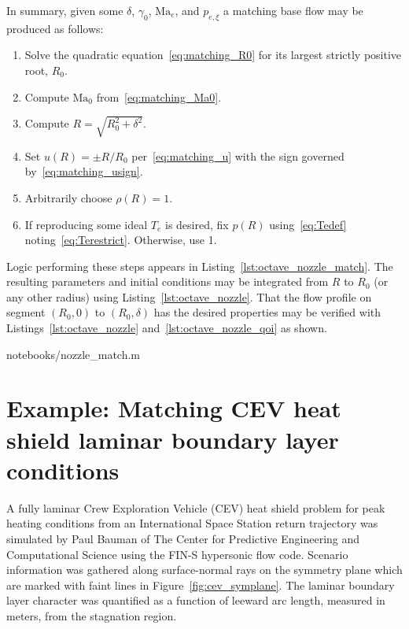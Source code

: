 \documentclass[letterpaper,11pt,nointlimits,reqno]{amsart}
\newcommand{\Mach}[1][]{\mbox{Ma}_{#1}}
\begin{document}
In summary, given some $\delta$, $\gamma_0$, $\Mach[e]$, and $p_{e,\xi}$ a
matching base flow may be produced as follows:
\begin{enumerate}
    \item Solve the quadratic equation~\eqref{eq:matching_R0} for 
        its largest strictly positive root, $R_0$.
    \item Compute $\Mach[0]{}$ from~\eqref{eq:matching_Ma0}.
    \item Compute $R = \sqrt{R_0^2 + \delta^2}$.
    \item Set $u\!\left(R\right)=\pm R / R_0$ per~\eqref{eq:matching_u}
        with the sign governed by~\eqref{eq:matching_usign}.
    \item Arbitrarily choose $\rho\!\left(R\right) = 1$.
    \item If reproducing some ideal $T_e$ is desired,
        fix $p\!\left(R\right)$ using~\eqref{eq:Tedef}
        noting~\eqref{eq:Terestrict}. Otherwise, use 1.
\end{enumerate}
Logic performing these steps appears in Listing~\ref{lst:octave_nozzle_match}.
The resulting parameters and initial conditions may be integrated from $R$ to
$R_0$ (or any other radius) using Listing~\ref{lst:octave_nozzle}. That the
flow profile on segment $\left( R_0, 0 \right)$ to $\left( R_0, \delta \right)$
has the desired properties may be verified with
Listings~\ref{lst:octave_nozzle} and~\ref{lst:octave_nozzle_qoi} as shown.


                {notebooks/nozzle_match.m}

\section{Example: Matching CEV heat shield laminar boundary layer conditions}

A fully laminar Crew Exploration Vehicle (CEV) heat shield problem for peak
heating conditions from an International Space Station return trajectory was
simulated by Paul Bauman of The Center for Predictive Engineering and
Computational Science using the FIN-S hypersonic flow
code\citep{KirkModeling2013}.  Scenario information was gathered along
surface-normal rays on the symmetry plane which are marked with faint lines in
Figure~\ref{fig:cev_symplane}.  The laminar boundary layer character was
quantified as a function of leeward arc length, measured in meters, from the
stagnation region.
\end{document}

